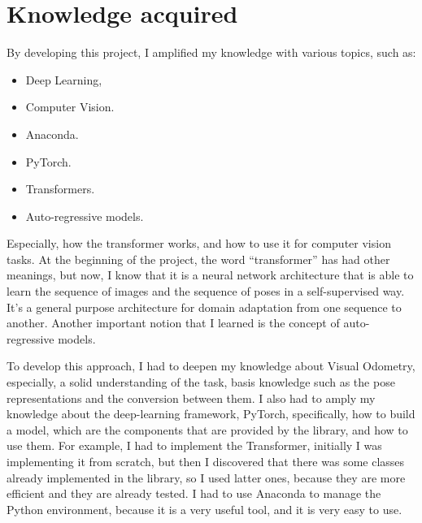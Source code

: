 \section{Knowledge acquired}\label{sec:knowledge-acquired}
By developing this project, I amplified my knowledge with various topics, such as:
\begin{itemize}
    \item Deep Learning,
    \item Computer Vision.
    \item Anaconda.
    \item PyTorch.
    \item Transformers.
    \item Auto-regressive models.
\end{itemize}
Especially, how the transformer works, and how to use it for computer vision tasks.
At the beginning of the project, the word ``transformer'' has had other meanings, but now, I know that it is a neural network architecture that is able to learn the sequence of images and the sequence of poses in a self-supervised way.
It's a general purpose architecture for domain adaptation from one sequence to another.
Another important notion that I learned is the concept of auto-regressive models.

To develop this approach, I had to deepen my knowledge about Visual Odometry, especially, a solid understanding of the task, basis knowledge such as the pose representations and the conversion between them.
I also had to amply my knowledge about the deep-learning framework, PyTorch, specifically, how to build a model, which are the components that are provided by the library, and how to use them.
For example, I had to implement the Transformer, initially I was implementing it from scratch, but then I discovered that there was some classes already implemented in the library, so I used latter ones, because they are more efficient and they are already tested.
I had to use Anaconda to manage the Python environment, because it is a very useful tool, and it is very easy to use.
